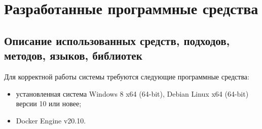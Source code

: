 \documentclass[../nirs.tex]{subfiles}
\begin{document}
    \section{Разработанные программные средства}
    \subsection{Описание использованных средств, подходов, методов, языков,
        библиотек}

    Для корректной работы системы требуются следующие программные средства:

    \begin{itemize}
        \item установленная система Windows 8 x64 (64-bit),
            Debian Linux x64 (64-bit) версии 10 или новее;
        \item Docker Engine v20.10.
    \end{itemize}
\end{document}
